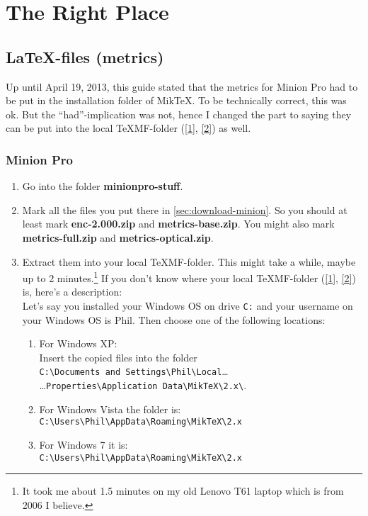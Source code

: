 \section{The Right Place}

\subsection{LaTeX-files (metrics)}

Up until April 19, 2013, this guide stated that the metrics for Minion Pro had to be put in the installation folder of MikTeX. To be technically correct, this was ok. But the ``had''-implication was not, hence I changed the part to saying they can be put into the local {\TeX}MF-folder (\href{http://en.wikipedia.org/wiki/TeX_Directory_Structure}{[1]}, \href{http://www.ctan.org/tex-archive/tds}{[2]}) as well.

\subsubsection{Minion Pro}

\begin{enumerate}\setlength{\itemsep}{-2pt}
	\item Go into the folder \textbf{minionpro-stuff}.
	\item Mark all the files you put there in \autoref{sec:download-minion}. So you should at least mark \textbf{enc-2.000.zip} and \textbf{metrics-base.zip}. You might also mark \textbf{metrics-full.zip} and \textbf{metrics-optical.zip}.
	\item Extract them into your local {\TeX}MF-folder. This might take a while, maybe up to 2 minutes.\footnote{It took me about 1.5 minutes on my old Lenovo T61 laptop which is from 2006 I believe.} If you don't know where your local {\TeX}MF-folder (\href{http://en.wikipedia.org/wiki/TeX_Directory_Structure}{[1]}, \href{http://www.ctan.org/tex-archive/tds}{[2]}) is, here's a description:\\
	Let's say you installed your Windows OS on drive \verb+C:+ and your username on your Windows OS is Phil. Then choose one of the following locations:
	\begin{enumerate}
		\item For Windows XP:\\
		Insert the copied files into the folder\\
			\verb+C:\Documents and Settings\Phil\Local+\ldots\\
		\ldots \verb+Properties\Application Data\MikTeX\2.x\+.
		\item \normalsize For Windows Vista the folder is:\\
		\verb+C:\Users\Phil\AppData\Roaming\MikTeX\2.x+
		\item For Windows 7 it is:\\
		\verb+C:\Users\Phil\AppData\Roaming\MikTeX\2.x+
	\end{enumerate}
\end{enumerate}

